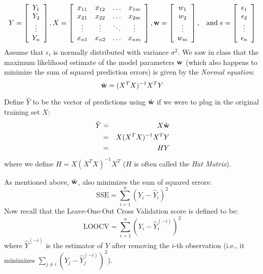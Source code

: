 \[
Y = \left[\begin{array}{c}
Y_1 \\
Y_2 \\
\vdots \\
Y_n
\end{array}\right],
X = \left[\begin{array}{cccc}
x_{11} & x_{12} & \dots & x_{1m} \\
x_{21} & x_{22} & \dots & x_{2m} \\
\vdots & \vdots & \ddots & \vdots \\
x_{n1} & x_{n2} & \dots & x_{nm} \\
\end{array}\right],
\mathbf{w} = \left[\begin{array}{c}
w_1 \\
w_2 \\
\vdots \\
w_m
\end{array}\right],
\,\,\,\,\,\mbox{and}\,\,
\epsilon = \left[\begin{array}{c}
\epsilon_1 \\
\epsilon_2 \\
\vdots \\
\epsilon_n
\end{array}\right]
\]
Assume that $\epsilon_i$ is normally distributed with variance
$\sigma^2$.  We saw in class that the maximum likelihood estimate of
the model parameters $\mathbf{w}$ (which also happens to minimize the sum of
squared prediction errors) is given by the \emph{Normal equation}:
\[
\hat{\mathbf{w}} = (X^TX)^{-1} X^TY
\]

\noindent Define $\hat{Y}$ to be the vector of predictions using
$\hat{\mathbf{w}}$ if we were to plug in the original training set $X$:
\begin{eqnarray*}
\hat{Y} &=& X\hat{\mathbf{w}}  \\
    &=& X(X^T X)^{-1} X^T Y \\
    &=& H Y
\end{eqnarray*}
where we define $H=X(X^T X)^{-1} X^T$ ($H$ is often called the
\emph{Hat Matrix}).

\noindent As mentioned above, $\hat{\mathbf{w}}$, also minimizes the sum of
squared errors:
\[
\mbox{SSE} = \sum_{i=1}^{n} (Y_i-\hat{Y}_i)^2
\]
Now recall that the Leave-One-Out Cross Validation score is defined to
be:
\[
\mbox{LOOCV} = \sum_{i=1}^n (Y_i - \hat{Y}_i^{(-i)})^2
\]
where $\hat{Y}^{(-i)}$ is the estimator of $Y$ after removing the
$i$-th observation (i.e., it minimizes $\sum_{j\neq i} (Y_j -
\hat{Y}_j^{(-i)})^2$). 

